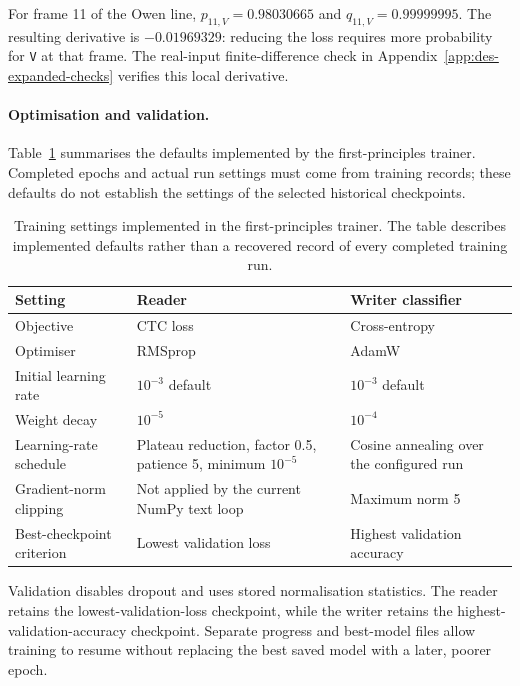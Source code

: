 For frame 11 of the Owen line, $p_{11,V}=0.98030665$ and $q_{11,V}=0.99999995$. The resulting derivative is $-0.01969329$: reducing the loss requires more probability for \texttt{V} at that frame. The real-input finite-difference check in Appendix~\ref{app:des-expanded-checks} verifies this local derivative.

\paragraph{Optimisation and validation.}
Table~\ref{tab:des-training} summarises the defaults implemented by the first-principles trainer. Completed epochs and actual run settings must come from training records; these defaults do not establish the settings of the selected historical checkpoints.

\begin{table}[!htbp]\centering\small
\begin{tabularx}{\linewidth}{|l|X|X|}
\hline\textbf{Setting}&\textbf{Reader}&\textbf{Writer classifier}\\\hline
Objective&CTC loss&Cross-entropy\\\hline
Optimiser&RMSprop&AdamW\\\hline
Initial learning rate&$10^{-3}$ default&$10^{-3}$ default\\\hline
Weight decay&$10^{-5}$&$10^{-4}$\\\hline
Learning-rate schedule&Plateau reduction, factor 0.5, patience 5, minimum $10^{-5}$&Cosine annealing over the configured run\\\hline
Gradient-norm clipping&Not applied by the current NumPy text loop&Maximum norm 5\\\hline
Best-checkpoint criterion&Lowest validation loss&Highest validation accuracy\\\hline
\end{tabularx}
\caption{Training settings implemented in the first-principles trainer. The table describes implemented defaults rather than a recovered record of every completed training run.}
\label{tab:des-training}
\end{table}

Validation disables dropout and uses stored normalisation statistics. The reader retains the lowest-validation-loss checkpoint, while the writer retains the highest-validation-accuracy checkpoint. Separate progress and best-model files allow training to resume without replacing the best saved model with a later, poorer epoch.

